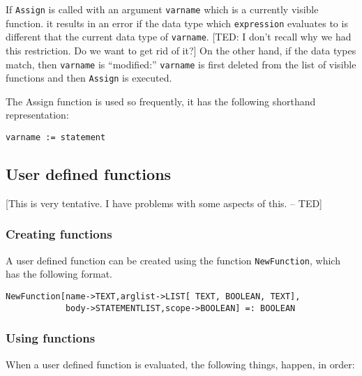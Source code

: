 If \verb+Assign+ is called with an argument \verb+varname+ which is a
currently visible function. it results in an error if the data type
which \verb+expression+ evaluates to is different that the current
data type of \verb+varname+.  [TED: I don't recall why we had this
restriction.  Do we want to get rid of it?] On the other hand, if the
data types match, then \verb+varname+ is ``modified:'' \verb+varname+
is first deleted from the list of visible functions and then
\verb+Assign+ is executed.  

The Assign function is used so frequently, it has the following shorthand
representation:
\begin{verbatim}
varname := statement
\end{verbatim}

\subsection{User defined functions}

[This is very tentative.  I have problems with some aspects of this. -- TED]

\subsubsection{Creating functions}
A user defined function can be created using the function
\verb+NewFunction+, which has the following format.

\begin{verbatim}
NewFunction[name->TEXT,arglist->LIST[ TEXT, BOOLEAN, TEXT], 
            body->STATEMENTLIST,scope->BOOLEAN] =: BOOLEAN
\end{verbatim}

\subsubsection{Using functions}

When a user defined function is evaluated, the following things,
happen, in order:


